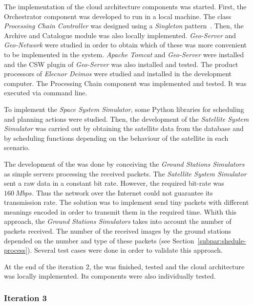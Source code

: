 The implementation of the cloud architecture components was started. First, the
Orchestrator component was developed to run in a local machine. The class
\emph{Processing Chain Controller} was designed using a \emph{Singleton} pattern~\cite{Garcia2013}. Then, the
Archive and Catalogue module was also locally implemented. \emph{Geo-Server} and
\emph{Geo-Network} were studied in order to obtain which of these was more convenient
to be implemented in the system. \emph{Apache Tomcat} and \emph{Geo-Server}
were installed and the \ac{CSW} plugin of \emph{Geo-Server} was also installed
and tested.
The product processors of \emph{Elecnor Deimos} were studied and installed in
the development computer. The Processing Chain component was implemented and
tested. It was executed via command line.

To implement the \emph{Space System Simulator}, some Python libraries for scheduling and planning
actions were studied. Then, the development of the \emph{Satellite System
  Simulator} was carried out by obtaining the satellite data from the database and
by scheduling functions depending on the behaviour of the satellite in each
scenario.

The development of the \gsss was done by conceiving the \emph{Ground Stations
  Simulators} as simple servers processing the received packets.   
The \emph{Satellite System Simulator}  sent a raw data in a constant
bit rate. However, the required bit-rate was $160~Mbps$. Thus the network over
the Internet could not guarantee its transmission rate. The solution was to
implement send tiny
packets with different meanings encoded in order to transmit them in the
required time.    
Whith this approach, the \emph{Ground Stations
  Simulators} takes into account the number of packets received. The number of
the received images by the ground stations depended on
the number and type of these packets (see Section~\ref{subpar:shedule-process}). Several test cases were done in order to validate
this approach.

At the end of the iteration 2, the \sss was finished, tested and the cloud
architecture was locally implemented. Its components were also individually tested.
 
\subsubsection{Iteration 3}

